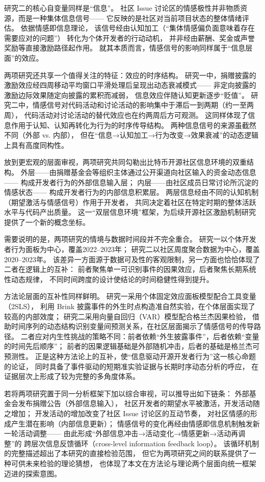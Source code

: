 \documentclass[
    type = master, %
    degree = professional,        %
    decl-page,  %
    twoside,                %
    fontset = fandol %
  ]{njuthesis}
\begin{document}
研究二的核心自变量同样是“信息”。
社区 Issue 讨论区的情感极性并非物质资源，而是一种集体信息信号——
它反映的是社区对当前项目状态的整体情绪评估。
依据情感即信息理论\cite{schwarz1983moods}，
该信号经由认知加工（“集体情感偏负面意味着存在需要应对的问题”）
转化为个体开发者的行动动机，
并非经由薪酬、奖金或声誉奖励等直接激励路径起作用。
就其本质而言，情感信号的影响同样属于“信息层面”的效应。

两项研究还共享一个值得关注的特征：效应的时序结构。
研究一中，捐赠披露的激励效应经四周移动平均窗口平滑处理后呈现出动态衰减模式——
非定向披露的激励边际效果随定向披露的累积而减弱，
信息效应伴随认知更新逐步“贬值”。
研究二中，情感信号对代码活动和讨论活动的影响集中于滞后一到两期（约一至两周），
代码活动对讨论活动的替代效应也在约两周后方可观测。
这同样体现了信息作用于认知、认知再转化为行为的时序传导结构。
两种信息信号的来源虽截然不同（外部 vs. 内部），
但在“信息→认知加工→行为改变→效果衰减”的动态逻辑上具有高度同构性。

放到更宏观的层面审视，两项研究共同勾勒出比特币开源社区信息环境的双重结构。
外层——由捐赠基金会等组织主体通过公开渠道向社区输入的资金动态信息——
构成开发者行为的外部信息输入层；
内层——由社区成员日常讨论所沉淀的情感状态——
构成开发者行为的内部信息积累层。
两层信息经由不同的认知机制（期望激活与情感信号）作用于开发者，
共同决定着社区在特定时期的整体活跃水平与代码产出质量。
这一“双层信息环境”框架，为后续开源社区激励机制研究提供了一个新的概念坐标。

需要说明的是，两项研究的情境与数据时间段并不完全重合。
研究一以个体开发者行为面板为中心，覆盖2022--2023年；
研究二以社区周度聚合数据为中心，覆盖2020--2023年。
该差异一方面源于数据可及性的客观限制，另一方面也恰恰体现了二者在逻辑上的互补：
前者聚焦单一可识别事件的因果效应，后者聚焦长期系统性动态规律，
不同时间跨度的设计使结论的时间稳健性得到提升。

方法论层面的互补性同样鲜明。
研究一采用个体固定效应面板模型配合工具变量（2SLS），
利用 Brink 披露事件的外生时点构造准自然实验，在个体层面实现了较高的内部效度；
研究二采用向量自回归（VAR）模型配合格兰杰因果检验，
借助时间序列的动态结构识别变量间预测关系，在社区层面揭示了情感信号的传导路径。
二者应对内生性挑战的策略不同：前者依赖“外生披露事件”，后者依赖“变量的时间先后顺序”；
前者的因果逻辑基础是外部随机冲击，后者的基础是格兰杰可预测性。
正是这种方法论上的互补，使“信息驱动开源开发者行为”这一核心命题的论证，
同时具备了事件驱动的短期准实验证据与长期时序动态分析的呼应，
在证据层次上形成了较为完整的多角度体系。

若将两项研究置于同一分析框架下加以综合审视，可以推导出如下链条：
外部基金会发布捐赠公告（外部信息输入），
社区开发者的期望水平被激活，开发活动随之增加；
开发活动的增加改变了社区 Issue 讨论区的互动节奏，
对社区情感的形成产生潜在影响（内部信息更新）；
情感信号的变化再经由情感即信息机制触发新一轮活动调整——
由此形成“外部信息冲击→活动变化→情感更新→活动再调整”的
跨层次信息反馈循环（cross-level information feedback loop）。
该循环机制的完整描述超出了本研究的直接检验范围，
但它为两项研究之间的联系提供了一种可供未来检验的理论猜想，
也体现了本文在方法论与理论两个层面向统一框架迈进的探索意图。
\end{document}
